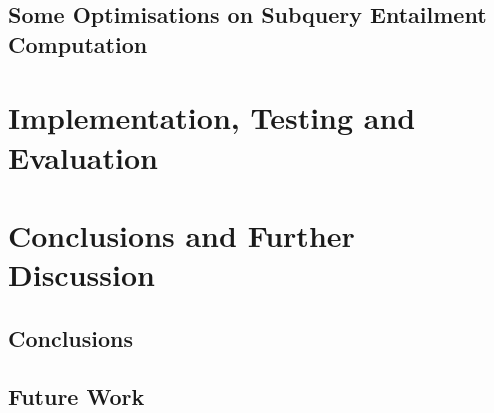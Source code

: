 \documentclass[12pt]{report}
\theoremstyle{plain}
\theoremstyle{definition}
\begin{document}


\section{Some Optimisations on Subquery Entailment Computation}
\label{secomputation-optimisations}


\newpage
\chapter{Implementation, Testing and Evaluation}




\newpage
\chapter{Conclusions and Further Discussion}

\section{Conclusions}

\section{Future Work}


\printbibliography
\end{document}
